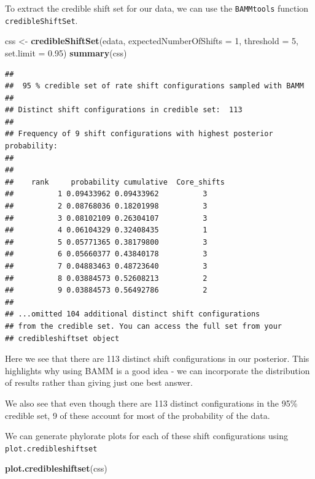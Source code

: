 \documentclass[]{book}
\newenvironment{Shaded}{\begin{snugshade}}{\end{snugshade}}
\newcommand{\KeywordTok}[1]{\textcolor[rgb]{0.13,0.29,0.53}{\textbf{{#1}}}}
\newcommand{\DataTypeTok}[1]{\textcolor[rgb]{0.13,0.29,0.53}{{#1}}}
\newcommand{\DecValTok}[1]{\textcolor[rgb]{0.00,0.00,0.81}{{#1}}}
\newcommand{\FloatTok}[1]{\textcolor[rgb]{0.00,0.00,0.81}{{#1}}}
\newcommand{\StringTok}[1]{\textcolor[rgb]{0.31,0.60,0.02}{{#1}}}
\newcommand{\NormalTok}[1]{{#1}}
\begin{document}
To extract the credible shift set for our data, we can use the
\texttt{BAMMtools} function \texttt{credibleShiftSet}.

\begin{Shaded}
\begin{Highlighting}[]
\NormalTok{css <-}\StringTok{ }\KeywordTok{credibleShiftSet}\NormalTok{(edata, }\DataTypeTok{expectedNumberOfShifts =} \DecValTok{1}\NormalTok{, }\DataTypeTok{threshold =} \DecValTok{5}\NormalTok{, }\DataTypeTok{set.limit =} \FloatTok{0.95}\NormalTok{)}
\KeywordTok{summary}\NormalTok{(css)}
\end{Highlighting}
\end{Shaded}

\begin{verbatim}
## 
##  95 % credible set of rate shift configurations sampled with BAMM
## 
## Distinct shift configurations in credible set:  113
## 
## Frequency of 9 shift configurations with highest posterior probability:
## 
## 
##    rank     probability cumulative  Core_shifts
##          1 0.09433962 0.09433962          3
##          2 0.08768036 0.18201998          3
##          3 0.08102109 0.26304107          3
##          4 0.06104329 0.32408435          1
##          5 0.05771365 0.38179800          3
##          6 0.05660377 0.43840178          3
##          7 0.04883463 0.48723640          3
##          8 0.03884573 0.52608213          2
##          9 0.03884573 0.56492786          2
## 
## ...omitted 104 additional distinct shift configurations
## from the credible set. You can access the full set from your 
## credibleshiftset object
\end{verbatim}

Here we see that there are 113 distinct shift configurations in our
posterior. This highlights why using BAMM is a good idea - we can
incorporate the distribution of results rather than giving just one best
answer.

We also see that even though there are 113 distinct configurations in
the 95\% credible set, 9 of these account for most of the probability of
the data.

We can generate phylorate plots for each of these shift configurations
using \texttt{plot.credibleshiftset}

\begin{Shaded}
\begin{Highlighting}[]
\KeywordTok{plot.credibleshiftset}\NormalTok{(css)}
\end{Highlighting}
\end{Shaded}
\end{document}
